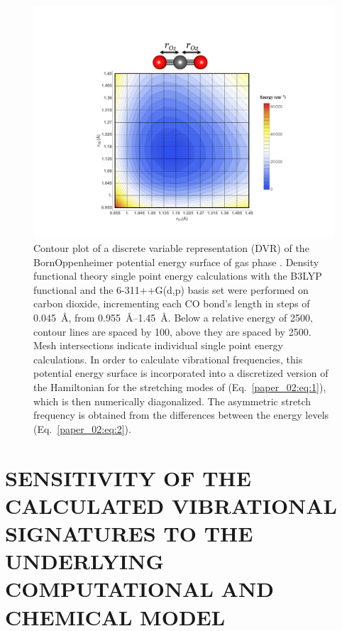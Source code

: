 \documentclass[%
  class = book,%
  crop = false,%
  float = true,%
  multi = true,%
  preview = false,%
]{standalone}
\newcommand{\caps}[1]{\uppercase{#1}}
\begin{document}
\begin{figure}
  \centering
  \includegraphics[scale=0.75]{Fig1.pdf}
  \caption[DVR contour plot]{Contour plot of a discrete variable representation (DVR) of the Born\textendash{}Oppenheimer potential energy surface of gas phase . Density functional theory single point energy calculations with the B3LYP functional and the 6-311++G(d,p) basis set were performed on carbon dioxide, incrementing each CO bond's length in steps of \SI{0.045}{\angstrom}, from \SIrange{0.955}{1.45}{\angstrom}. Below a relative energy of \SI{2500}{\wavenumber}, contour lines are spaced by \SI{100}{\wavenumber}, above they are spaced by \SI{2500}{\wavenumber}. Mesh intersections indicate individual single point energy calculations. In order to calculate vibrational frequencies, this potential energy surface is incorporated into a discretized version of the Hamiltonian for the stretching modes of  (Eq.~\ref{paper_02:eq:1}), which is then numerically diagonalized. The asymmetric stretch frequency is obtained from the differences between the energy levels (Eq.~\ref{paper_02:eq:2}).}
  \label{paper_02:fig:1}
\end{figure}

\section{\texorpdfstring{\caps{Sensitivity of the Calculated Vibrational Signatures to the Underlying Computational and Chemical Model}}{Sensitivity of the Calculated Vibrational Signatures to the Underlying Computational and Chemical Model}}
\label{paper_02:sec:III}
\end{document}
